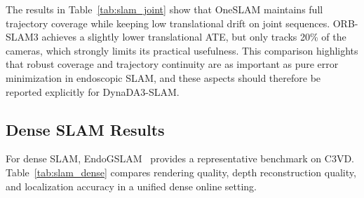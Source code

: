 The results in Table~\ref{tab:slam_joint} show that OneSLAM maintains full trajectory coverage while keeping low translational drift on joint sequences. ORB-SLAM3 achieves a slightly lower translational ATE, but only tracks 20\% of the cameras, which strongly limits its practical usefulness. This comparison highlights that robust coverage and trajectory continuity are as important as pure error minimization in endoscopic SLAM, and these aspects should therefore be reported explicitly for DynaDA3-SLAM.

\subsection{Dense SLAM Results}
For dense SLAM, EndoGSLAM~\cite{endogslam2024} provides a representative benchmark on C3VD. Table~\ref{tab:slam_dense} compares rendering quality, depth reconstruction quality, and localization accuracy in a unified dense online setting.

\begin{table}[htbp]
    \centering
    \caption[Dense SLAM results on C3VD]{Comparison of dense SLAM results on C3VD, reproduced from EndoGSLAM~\cite{endogslam2024}.}
    \label{tab:slam_dense}
\end{table}

